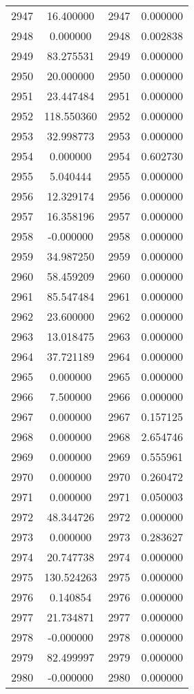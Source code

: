 \documentclass[12pt]{article}
\begin{document}
\begin{longtable}{@{}cccc@{}}
2947 & 16.400000 & 2947 & 0.000000 \\
2948 & 0.000000 & 2948 & 0.002838 \\
2949 & 83.275531 & 2949 & 0.000000 \\
2950 & 20.000000 & 2950 & 0.000000 \\
2951 & 23.447484 & 2951 & 0.000000 \\
2952 & 118.550360 & 2952 & 0.000000 \\
2953 & 32.998773 & 2953 & 0.000000 \\
2954 & 0.000000 & 2954 & 0.602730 \\
2955 & 5.040444 & 2955 & 0.000000 \\
2956 & 12.329174 & 2956 & 0.000000 \\
2957 & 16.358196 & 2957 & 0.000000 \\
2958 & -0.000000 & 2958 & 0.000000 \\
2959 & 34.987250 & 2959 & 0.000000 \\
2960 & 58.459209 & 2960 & 0.000000 \\
2961 & 85.547484 & 2961 & 0.000000 \\
2962 & 23.600000 & 2962 & 0.000000 \\
2963 & 13.018475 & 2963 & 0.000000 \\
2964 & 37.721189 & 2964 & 0.000000 \\
2965 & 0.000000 & 2965 & 0.000000 \\
2966 & 7.500000 & 2966 & 0.000000 \\
2967 & 0.000000 & 2967 & 0.157125 \\
2968 & 0.000000 & 2968 & 2.654746 \\
2969 & 0.000000 & 2969 & 0.555961 \\
2970 & 0.000000 & 2970 & 0.260472 \\
2971 & 0.000000 & 2971 & 0.050003 \\
2972 & 48.344726 & 2972 & 0.000000 \\
2973 & 0.000000 & 2973 & 0.283627 \\
2974 & 20.747738 & 2974 & 0.000000 \\
2975 & 130.524263 & 2975 & 0.000000 \\
2976 & 0.140854 & 2976 & 0.000000 \\
2977 & 21.734871 & 2977 & 0.000000 \\
2978 & -0.000000 & 2978 & 0.000000 \\
2979 & 82.499997 & 2979 & 0.000000 \\
2980 & -0.000000 & 2980 & 0.000000 \\

\end{longtable}
\end{document}
